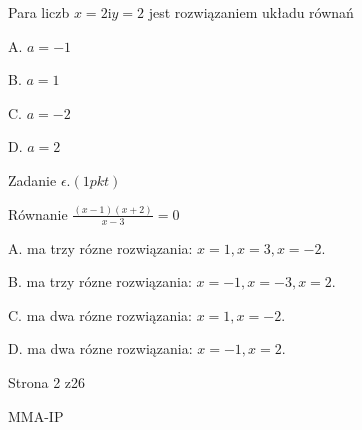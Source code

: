 \documentclass[a4paper,12pt]{article}
\begin{document}
Para liczb $x=2 \mathrm{i}y=2$ jest rozwiązaniem układu równań 

A. $a=-1$

B. $a=1$

C. $a=-2$

D. $a=2$

Zadanie $\epsilon. (1pkt)$

Równanie $\displaystyle \frac{(x-1)(x+2)}{x-3}=0$

A. ma trzy rózne rozwiązania: $x=1, x=3, x=-2.$

B. ma trzy rózne rozwiązania: $x=-1, x=-3, x=2.$

C. ma dwa rózne rozwiązania: $x=1, x=-2.$

D. ma dwa rózne rozwiązania: $x=-1, x=2.$

Strona 2 z26

MMA-IP
\end{document}
